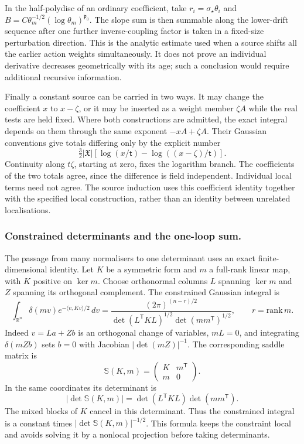 \documentclass[11pt,letterpaper,reqno]{amsart}
\theoremstyle{definition}
\theoremstyle{remark}
\begin{document}
In the half-polydisc of an ordinary coefficient, take
$r_i=\sigma_\star\theta_i$ and
$B=C\theta_m^{-1/2}(\log\theta_m)^{\mathfrak p_0}$.
The slope sum is then summable along the lower-drift
sequence after one further inverse-coupling factor is
taken in a fixed-size perturbation direction. This is the
analytic estimate used when a source shifts all the
earlier action weights simultaneously. It does not prove
an individual derivative decreases geometrically with
its age; such a conclusion would require additional
recursive information.

Finally a constant source can be carried in two ways.
It may change the coefficient $x$ to $x-\zeta$, or it
may be inserted as a weight member $\zeta A$ while the
real tests are held fixed. Where both constructions are
admitted, the exact integral depends on them through the
same exponent $-xA+\zeta A$. Their Gaussian conventions
give totals differing only by the explicit number
\[
 \tfrac32|\mathfrak X|
            [\log(x/\mathsf t)-\log((x-\zeta)/\mathsf t)].
\]
Continuity along $t\zeta$, starting at zero, fixes the
logarithm branch. The coefficients of the two totals agree,
since the difference is field independent. Individual
local terms need not agree. The source induction uses this
coefficient identity together with the specified local
construction, rather than an identity between unrelated
localisations.

\subsubsection*{Constrained determinants and the one-loop sum.}
The passage from many normalisers to one determinant uses
an exact finite-dimensional identity. Let $K$ be a symmetric
form and $m$ a full-rank linear map, with $K$ positive on
$\ker m$. Choose orthonormal columns $L$ spanning $\ker m$
and $Z$ spanning its orthogonal complement. The constrained
Gaussian integral is
\[
 \int_{\mathbb R^n}\delta(mv)e^{-\langle v,Kv\rangle/2}\,dv
   =\frac{(2\pi)^{(n-r)/2}}
        {\det(L^{\mathsf T}KL)^{1/2}\det(mm^{\mathsf T})^{1/2}},
 \qquad r=\mathrm{rank}\,m.
\]
Indeed $v=La+Zb$ is an orthogonal change of variables,
$mL=0$, and integrating $\delta(mZb)$ sets $b=0$ with
Jacobian $|\det(mZ)|^{-1}$. The corresponding saddle
matrix is
\[
 \mathbb S(K,m)=
       \begin{pmatrix}K&m^{\mathsf T}\\m&0\end{pmatrix}.
\]
In the same coordinates its determinant is
\begin{equation}\label{eq:deep-saddle-determinant}
 |\det\mathbb S(K,m)|
         =\det(L^{\mathsf T}KL)\det(mm^{\mathsf T}).
\end{equation}
The mixed blocks of $K$ cancel in this determinant. Thus
the constrained integral is a constant times
$|\det\mathbb S(K,m)|^{-1/2}$. This formula keeps the
constraint local and avoids solving it by a nonlocal
projection before taking determinants.
\end{document}
